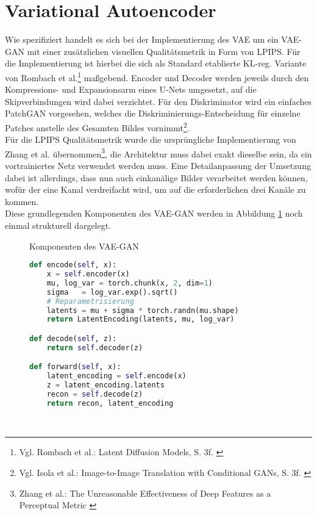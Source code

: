 \section {Variational Autoencoder}

Wie spezifiziert handelt es sich bei der Implementierung des \ac{VAE} um ein VAE-GAN mit einer zusätzlichen visuellen Qualitätsmetrik in Form von \ac{LPIPS}. Für die Implementierung ist hierbei die sich als Standard etablierte KL-reg. Variante von Rombach et al.\footnote{
    Vgl. Rombach et al.: Latent Diffusion Models, S. 3f.
    \cite{rombach2022high}
} maßgebend. Encoder und Decoder werden jeweils durch den Kompressions- und Expansionsarm eines U-Nets umgesetzt, auf die Skipverbindungen wird dabei verzichtet. Für den Diskriminator wird ein einfaches PatchGAN vorgesehen, welches die Diskriminierungs-Entscheidung für einzelne Patches anstelle des Gesamten Bildes vornimmt\footnote{
    Vgl. Isola et al.: Image-to-Image Translation with Conditional GANs, S. 3f.
    \cite{isola2018imagetoimagetranslationconditionaladversarial}
}. \\
Für die \ac{LPIPS} Qualitätsmetrik wurde die ursprüngliche Implementierung von Zhang et al. übernommen\footnote{
    Zhang et al.: The Unreasonable Effectiveness of Deep Features as a Perceptual Metric
    \cite{zhang2018unreasonableeffectivenessdeepfeatures}
}, die Architektur muss dabei exakt dieselbe sein, da ein vortrainiertes Netz verwendet werden muss. Eine Detailanpassung der Umsetzung dabei ist allerdings, dass nun auch einkanälige Bilder verarbeitet werden können, wofür der eine Kanal verdreifacht wird, um auf die erforderlichen drei Kanäle zu kommen. \\
Diese grundlegenden Komponenten des VAE-GAN werden in Abbildung \ref{fig:vae_arch} noch einmal strukturell dargelegt. 
\begin{figure}[htbp]
    \centering
    \caption{Komponenten des VAE-GAN}
    \label{fig:vae_arch}
\end{figure}
\begin{figure}[htbp]
\begin{lstlisting}[language=python]
def encode(self, x):
    x = self.encoder(x)
    mu, log_var = torch.chunk(x, 2, dim=1) 
    sigma   = log_var.exp().sqrt()
    # Reparametrisierung
    latents = mu + sigma * torch.randn(mu.shape)
    return LatentEncoding(latents, mu, log_var)

def decode(self, z):
    return self.decoder(z)

def forward(self, x):
    latent_encoding = self.encode(x) 
    z = latent_encoding.latents
    recon = self.decode(z)
    return recon, latent_encoding
\end{lstlisting}
    \captionsetup{type=figure}
    \label{fig:vae_forward}
\end{figure} \\
